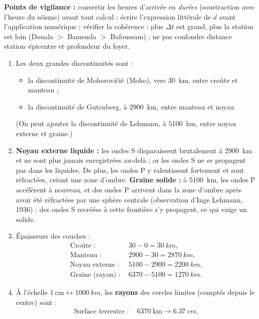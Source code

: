 \documentclass[11pt]{article}
\newcommand{\cle}[1]{{\popxbold\color{popdark}#1}}
\begin{document}
\begin{corrige}
\textbf{Points de vigilance :} convertir les heures d'arrivée en \emph{durées} (soustraction avec l'heure du séisme) avant tout calcul ; écrire l'expression littérale de $d$ avant l'application numérique ; vérifier la cohérence : plus $\Delta t$ est grand, plus la station est loin (Douala $>$ Bamenda $>$ Bafoussam) ; ne pas confondre distance station--épicentre et profondeur du foyer.
\end{corrige}

\begin{corrige}
\begin{enumerate}
\item Les deux grandes discontinuités sont :
\begin{itemize}
\item la discontinuité de \cle{Mohorovičić} (Moho), vers \SI{30}{km}, entre croûte et manteau ;
\item la discontinuité de \cle{Gutenberg}, à \SI{2900}{km}, entre manteau et noyau.
\end{itemize}
(On peut ajouter la discontinuité de \cle{Lehmann}, à \SI{5100}{km}, entre noyau externe et graine.)
\item \textbf{Noyau externe liquide :} les ondes S disparaissent brutalement à \SI{2900}{km} et ne sont plus jamais enregistrées au-delà ; or les ondes S ne se propagent pas dans les liquides. De plus, les ondes P y ralentissent fortement et sont réfractées, créant une zone d'ombre. \textbf{Graine solide :} à \SI{5100}{km}, les ondes P accélèrent à nouveau, et des ondes P arrivent dans la zone d'ombre après avoir été réfractées par une sphère centrale (observation d'Inge Lehmann, 1936) ; des ondes S recréées à cette frontière s'y propagent, ce qui exige un solide.
\item Épaisseurs des couches :
\begin{align*}
\text{Croûte : } & 30 - 0 = \SI{30}{km},\\
\text{Manteau : } & 2900 - 30 = \SI{2870}{km},\\
\text{Noyau externe : } & 5100 - 2900 = \SI{2200}{km},\\
\text{Graine (rayon) : } & 6370 - 5100 = \SI{1270}{km}.
\end{align*}
\item À l'échelle $1\ \text{cm} \leftrightarrow \SI{1000}{km}$, les \textbf{rayons} des cercles limites (comptés depuis le centre) sont :
\begin{align*}
\text{Surface terrestre : } & 6370\ \text{km} \rightarrow \SI{6,37}{cm},\\

\end{align*}
\end{enumerate}
\end{corrige}
\end{document}

